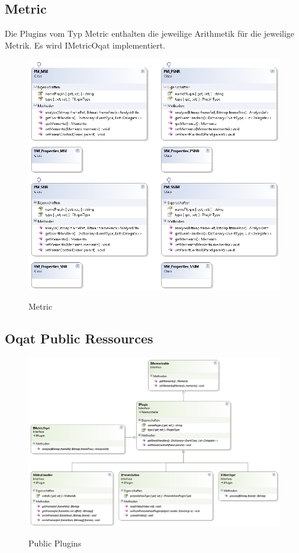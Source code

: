 \pagebreak
\subsection{Metric}
Die Plugins vom Typ Metric enthalten die jeweilige Arithmetik für die jeweilige Metrik. Es wird IMetricOqat implementiert.
\begin{figure}[h]
\noindent\includegraphics[width=\linewidth,height=\textheight,
keepaspectratio]{bilder/Klassendiagramm/Plugins2.png}
\label{}
\caption{Metric}
\end{figure}

\pagebreak
\subsection{Oqat Public Ressources}
\begin{figure}[h]
\noindent\includegraphics[width=\linewidth,height=\textheight,
keepaspectratio]{bilder/Klassendiagramm/PluginInterfaces.png}
\label{}
\caption{Public Plugins}
\end{figure}

